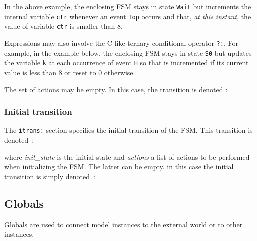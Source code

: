 In the above example, the enclosing FSM stays in state \verb|Wait| but increments the internal
variable \verb|ctr| whenever an event \verb|Top| occurs and that, \emph{at this instant}, the
value of variable \verb|ctr| is smaller than 8. 

\medskip
Expressions may also involve the C-like ternary conditional operator \verb|?:|.
For example, in the example below, the enclosing FSM stays in state \verb|S0| but updates the variable \verb|k|
at each occurrence of event \verb|H| so that is incremented if its current value is less than 8 or
reset to 0 otherwise.

\begin{center}
\end{center}


\medskip
The set of actions may be empty. In this case, the transition is denoted :

\begin{center}
\end{center}

\subsubsection*{Initial transition}
\label{sec:initial-transition}

The \verb|itrans:| section specifies the initial transition of the FSM. This transition is denoted~:

\begin{center}
\end{center}

where \emph{init\_state} is the initial state and \emph{actions} a list of actions to be performed
when initializing the FSM. The latter can be empty. in this case the initial transition is simply
denoted~:

\begin{center}
\end{center}

\subsection{Globals}
\label{sec:globals}

Globals are used to connect model instances to the external world or to other instances.

